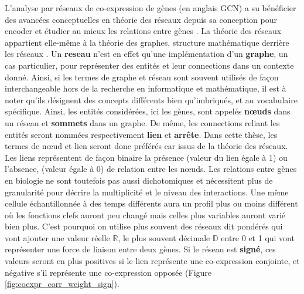 L'analyse par réseaux de co-expression de gènes (en anglais \acrfull{GCN}) a su bénéficier des avancées conceptuelles en théorie des réseaux depuis sa conception pour encoder et étudier au mieux les relations entre gènes \cite{Barabasi2011Jan}. La théorie des réseaux appartient elle-même à la théorie des graphes, structure mathématique derrière les réseaux \cite{Barnes1983Jun}. Un \textbf{\gls{reseau}} n'est en effet qu'une implémentation d'un \textbf{\gls{graphe}}, un cas particulier, pour représenter des entités et leur connections dans un contexte donné. Ainsi, si les termes de graphe et réseau sont souvent utilisés de façon interchangeable hors de la recherche en informatique et mathématique, il est à noter qu'ils désignent des concepts différents bien qu'imbriqués, et au vocabulaire spécifique. Ainsi, les entités considérées, ici les gènes, sont appelés \textbf{nœuds} dans un réseau et \textbf{sommets} dans un graphe. De même, les connections reliant les entités seront nommées respectivement \textbf{lien} et \textbf{arrête}. Dans cette thèse, les termes de nœud et lien seront donc préférés car issus de la théorie des réseaux. Les liens représentent de façon binaire la présence (valeur du lien égale à 1) ou l'absence, (valeur égale à 0) de relation entre les nœuds. Les relations entre gènes en biologie ne sont toutefois pas aussi dichotomiques et nécessitent plus de granularité pour décrire la multiplicité et le niveau des interactions. Une même cellule échantillonnée à des temps différents aura un profil plus ou moins différent où les fonctions clefs auront peu changé mais celles plus variables auront varié bien plus. C'est pourquoi on utilise plus souvent des réseaux dit pondérés qui vont ajouter une valeur réelle $\mathbb{R}$, le plus souvent décimale $\mathbb{D}$ entre 0 et 1 qui vont représenter une force de liaison entre deux gènes. Si le réseau est \textbf{signé}, ces valeurs seront en plus positives si le lien représente une co-expression conjointe, et négative s’il représente une co-expression opposée (Figure \ref{fig:coexpr_corr_weight_sign}).

